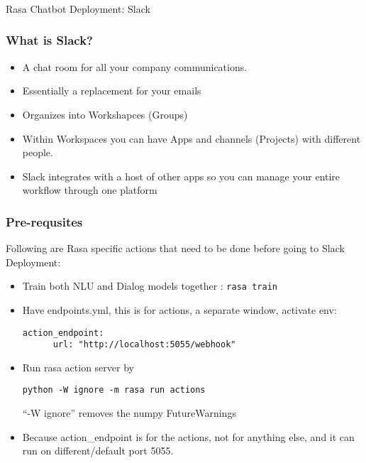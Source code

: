 \begin{frame}[fragile]\frametitle{}
\begin{center}
{\Large Rasa Chatbot Deployment: Slack}

\end{center}
\end{frame}

\begin{frame}[fragile]\frametitle{What is Slack?}
\begin{itemize}
\item A chat room for all your company communications.
\item Essentially a replacement for your emails
\item Organizes into Workshapces (Groups)
\item Within Workspaces you can have Apps and channels (Projects) with different people.
\item Slack integrates with a host of other apps so you can manage your entire workflow through one platform
\end{itemize}

\end{frame}

\begin{frame}[fragile]\frametitle{Pre-requsites}
Following are Rasa specific actions that need to be done before going to Slack Deployment:
\begin{itemize}
\item Train both NLU and Dialog models together : \lstinline|rasa train|
\item Have endpoints.yml, this is for actions, a separate window, activate env: 
\begin{lstlisting}
action_endpoint:
	  url: "http://localhost:5055/webhook"
\end{lstlisting}
\item Run rasa action server by
\begin{lstlisting}
python -W ignore -m rasa run actions
\end{lstlisting}
``-W ignore'' removes the numpy FutureWarnings
\item Because action\_endpoint is for the actions, not for anything else, and it can run on different/default port 5055.
\end{itemize}

\end{frame}

